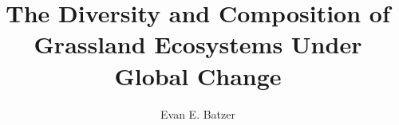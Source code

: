 \documentclass[twoside,12pt,final]{ucthesis-CA2012}
\begin{document}
\begin{ucfrontmatter}


  \title{The Diversity and Composition of Grassland Ecosystems Under Global Change}
  \author{Evan E. Batzer}

   
  \othermemberC{} %
  
	\maketitle
	
  

\end{ucfrontmatter}
\end{document}
